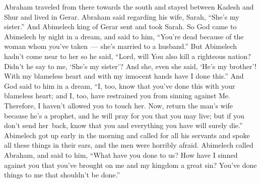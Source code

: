 
\begin{inparaenum}
   Abraham traveled from there towards the south and stayed between Kadesh and Shur and lived in Gerar.%
   Abraham said regarding his wife, Sarah, ``She's my sister.'' And Abimelech king of Gerar sent and took Sarah.%
   So God came to Abimelech by night in a dream, and said to him, ``You're dead because of the woman whom you've taken~--- she's married to a husband.''%
   But Abimelech hadn't come near to her so he said, ``Lord, will You also kill a righteous nation?%
   Didn't he say to me, `She's my sister'? And she, even she said, `He's my brother'! With my blameless heart and with my innocent hands have I done this.''%
   And God said to him in a dream, ``I, too, know that you've done this with your blameless heart; and I, too, have restrained you from sinning against Me. Therefore, I haven't allowed you to touch her.%
   Now, return the man's wife because he's a prophet, and he will pray for you that you may live; but if you don't send her\understood\ back, know that you and everything you have will surely die.''%
   Abimelech got up early in the morning and called for all his servants and spoke all these things in their ears, and the men were horribly afraid.%
   Abimelech called Abraham, and said to him, ``What have you done to us? How have I sinned against you that you've brought on me and my kingdom a great sin? You've done things to me that shouldn't be done.''%

\end{inparaenum}
